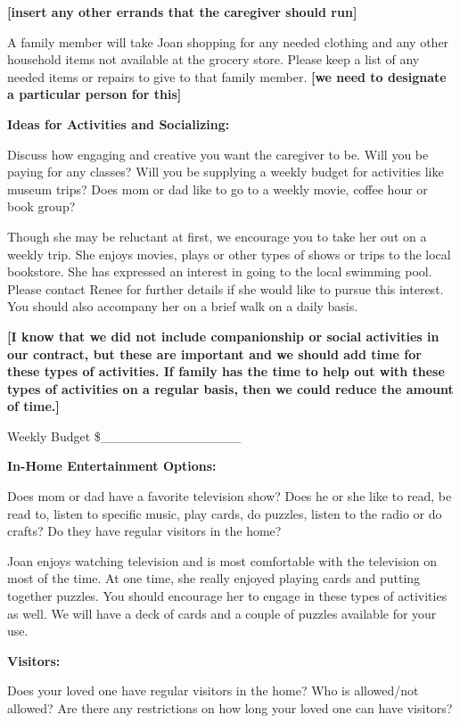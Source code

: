 \documentclass[]{article}
\begin{document}
\textbf{{[}insert any other errands that the caregiver should run{]}}

A family member will take Joan shopping for any needed clothing and any
other household items not available at the grocery store. Please keep a
list of any needed items or repairs to give to that family member.
\textbf{{[}we need to designate a particular person for this{]}}

\textbf{Ideas for Activities and Socializing:}

Discuss how engaging and creative you want the caregiver to be. Will you
be paying for any classes? Will you be supplying a weekly budget for
activities like museum trips? Does mom or dad like to go to a weekly
movie, coffee hour or book group?

Though she may be reluctant at first, we encourage you to take her out
on a weekly trip. She enjoys movies, plays or other types of shows or
trips to the local bookstore. She has expressed an interest in going to
the local swimming pool. Please contact Renee for further details if she
would like to pursue this interest. You should also accompany her on a
brief walk on a daily basis.

\textbf{{[}I know that we did not include companionship or social
activities in our contract, but these are important and we should add
time for these types of activities. If family has the time to help out
with these types of activities on a regular basis, then we could reduce
the amount of time.{]}}

Weekly Budget \$\_\_\_\_\_\_\_\_\_\_\_\_\_\_\_

\textbf{In-Home Entertainment Options:}

Does mom or dad have a favorite television show? Does he or she like to
read, be read to, listen to specific music, play cards, do puzzles,
listen to the radio or do crafts? Do they have regular visitors in the
home?

Joan enjoys watching television and is most comfortable with the
television on most of the time. At one time, she really enjoyed playing
cards and putting together puzzles. You should encourage her to engage
in these types of activities as well. We will have a deck of cards and a
couple of puzzles available for your use.

\textbf{Visitors:}

Does your loved one have regular visitors in the home? Who is
allowed/not allowed? Are there any restrictions on how long your loved
one can have visitors?
\end{document}
